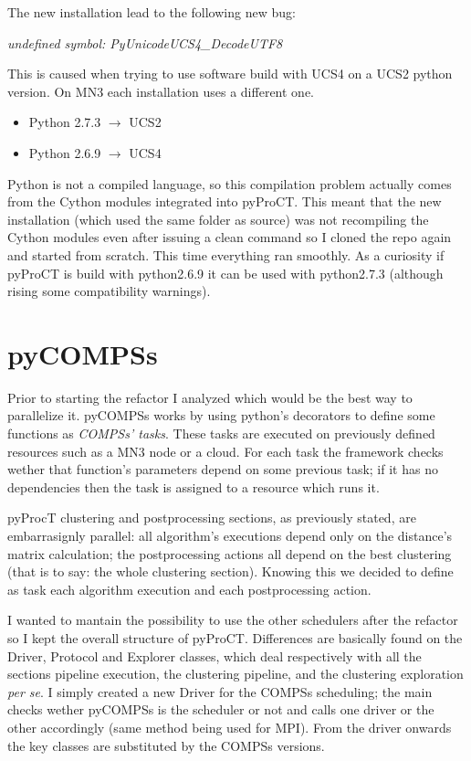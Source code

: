 The new installation lead to the following new bug: 

\textit{undefined symbol: PyUnicodeUCS4\_DecodeUTF8}

This is caused when trying to use software build with UCS4 on a UCS2 python version. On MN3 each installation uses a different one.

\begin{itemize}
\itemsep0em 
\item Python 2.7.3 $\rightarrow$ UCS2
\item Python 2.6.9 $\rightarrow$ UCS4
\end{itemize}

Python is not a compiled language, so this compilation problem actually comes from the Cython modules integrated into pyProCT. This meant that the new installation (which used the same folder as source) was not recompiling the Cython modules even after issuing a clean command so I cloned the repo again and started from scratch. This time everything ran smoothly. As a curiosity if pyProCT is build with python2.6.9 it can be used with python2.7.3 (although rising some compatibility warnings).

\section{pyCOMPSs}

Prior to starting the refactor I analyzed which would be the best way to parallelize it. pyCOMPSs works by using python's decorators to define some functions as \textit{COMPSs' tasks}. These tasks are executed on previously defined resources such as a MN3 node or a cloud. For each task the framework checks wether that function's parameters depend on some previous task; if it has no dependencies then the task is assigned to a resource which runs it. 

pyProcT clustering and postprocessing sections, as previously stated, are embarrasignly parallel: all algorithm's executions depend only on the distance's matrix calculation; the postprocessing actions all depend on the best clustering (that is to say: the whole clustering section). Knowing this we decided to define as task each algorithm execution and each postprocessing action.

I wanted to mantain the possibility to use the other schedulers after the refactor so I kept the overall structure of pyProCT. Differences are basically found on the Driver, Protocol and Explorer classes, which deal respectively with all the sections pipeline execution, the clustering pipeline, and the clustering exploration \textit{per se}. I simply created a new Driver for the COMPSs scheduling; the main checks wether pyCOMPSs is the scheduler or not and calls one driver or the other accordingly (same method being used for MPI). From the driver onwards the key classes are substituted by the COMPSs versions.

